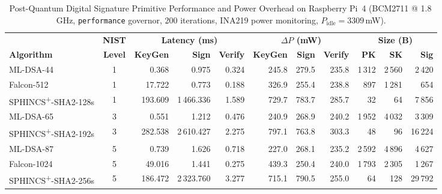 \begin{table}[!t]
\centering
\footnotesize
\setlength{\tabcolsep}{3.8pt}
\caption{Post-Quantum Digital Signature Primitive Performance and Power Overhead on Raspberry Pi~4 (BCM2711 @ 1.8\,GHz, \texttt{performance} governor, 200 iterations, INA219 power monitoring, $P_{\mathrm{idle}}=3309$\,mW).}
\label{tab:sig-primitives}
\begin{tabular}{@{}l c r r r r r r r r r@{}}
\toprule
 & \textbf{NIST} & \multicolumn{3}{c}{\textbf{Latency (ms)}} & \multicolumn{3}{c}{\textbf{$\Delta P$ (mW)}} & \multicolumn{3}{c}{\textbf{Size (B)}} \\
\cmidrule(lr){3-5} \cmidrule(lr){6-8} \cmidrule(lr){9-11}
\textbf{Algorithm} & \textbf{Level} & \textbf{KeyGen} & \textbf{Sign} & \textbf{Verify} & \textbf{KeyGen} & \textbf{Sign} & \textbf{Verify} & \textbf{PK} & \textbf{SK} & \textbf{Sig} \\
\midrule
ML-DSA-44                  & 1 &    0.368 &    0.975 &  0.324 & 245.8 & 279.5 & 235.8 &  1\,312 &  2\,560 &  2\,420 \\
Falcon-512                 & 1 &   17.722 &    0.773 &  0.188 & 326.9 & 255.4 & 238.8 &    897 &  1\,281 &    654 \\
SPHINCS\textsuperscript{+}-SHA2-128s & 1 &  193.609 & 1\,466.336 &  1.589 & 729.7 & 783.7 & 285.7 &     32 &     64 &  7\,856 \\
\midrule
ML-DSA-65                  & 3 &    0.551 &    1.212 &  0.476 & 240.9 & 268.9 & 240.2 &  1\,952 &  4\,032 &  3\,309 \\
SPHINCS\textsuperscript{+}-SHA2-192s & 3 &  282.538 & 2\,610.427 &  2.275 & 797.1 & 763.8 & 303.3 &     48 &     96 & 16\,224 \\
\midrule
ML-DSA-87                  & 5 &    0.739 &    1.626 &  0.718 & 227.0 & 268.1 & 235.2 &  2\,592 &  4\,896 &  4\,627 \\
Falcon-1024                & 5 &   49.016 &    1.441 &  0.275 & 439.3 & 250.4 & 240.0 &  1\,793 &  2\,305 &  1\,267 \\
SPHINCS\textsuperscript{+}-SHA2-256s & 5 &  186.472 & 2\,323.760 &  3.277 & 715.1 & 790.5 & 255.0 &     64 &    128 & 29\,792 \\
\bottomrule
\end{tabular}
\end{table}
